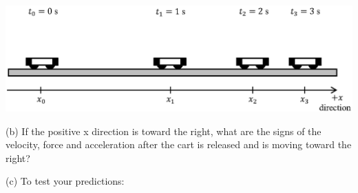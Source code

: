 \vspace{0.3cm}
{\par\centering \includegraphics{force2/carts_slowing.eps} \par}
\vspace{0.3cm}

(b) If the positive x direction is toward the right, what are the signs of the
velocity, force and acceleration after the cart is released and is moving toward
the right?
\vspace{10mm}

(c) To test your predictions: 

